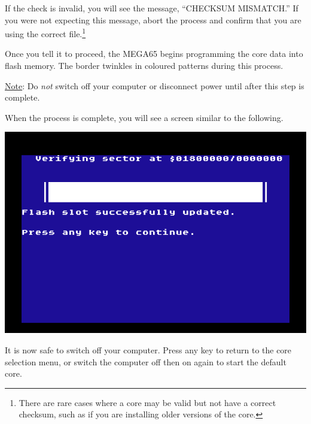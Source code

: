 If the check is invalid, you will see the message, ``CHECKSUM MISMATCH.'' If you were not expecting this message, abort the process and confirm that you are using the correct file.\footnote{There are rare cases where a core may be valid but not have a correct checksum, such as if you are installing older versions of the core.}

Once you tell it to proceed, the MEGA65 begins programming the core data into flash memory. The border twinkles in coloured patterns during this process.

\underline{Note}: Do {\em not} switch off your computer or disconnect power until after this step is complete.

\begin{center}
\end{center}

When the process is complete, you will see a screen similar to the following.

\begin{center}
  \includegraphics[width=0.7\linewidth]{images/ss-flashmenu-done.png}
\end{center}

It is now safe to switch off your computer. Press any key to return to the core selection menu, or switch the computer off then on again to start the default core.


